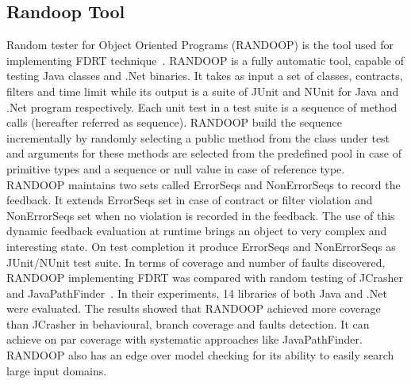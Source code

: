 \subsection{Randoop Tool}
Random tester for Object Oriented Programs (RANDOOP) is the tool used for implementing FDRT technique~\cite{Pacheco2007b}. RANDOOP is a fully automatic tool, capable of testing Java classes and .Net binaries. It takes as input a set of classes, contracts, filters and time limit while its output is a suite of JUnit and NUnit for Java and .Net program respectively. Each unit test in a test suite is a sequence of method calls (hereafter referred as sequence). RANDOOP build the sequence incrementally by randomly selecting a public method from the class under test and arguments for these methods are selected from the predefined pool in case of primitive types and a sequence or null value in case of reference type. RANDOOP maintains two sets called ErrorSeqs and NonErrorSeqs to record the feedback. It extends ErrorSeqs set in case of contract or filter violation and NonErrorSeqs set when no violation is recorded in the feedback. The use of this dynamic feedback evaluation at runtime brings an object to very complex and interesting state. On test completion it produce ErrorSeqs and NonErrorSeqs as JUnit/NUnit test suite. In terms of coverage and number of faults discovered, RANDOOP implementing FDRT was compared with random testing of JCrasher and JavaPathFinder~\cite{visser2004test}. In their experiments, 14 libraries of both Java and .Net were evaluated. The results showed that RANDOOP achieved more coverage than JCrasher in behavioural, branch coverage and faults detection. It can achieve on par coverage with systematic approaches like JavaPathFinder. RANDOOP also has an edge over model checking for its ability to easily search large input domains.

